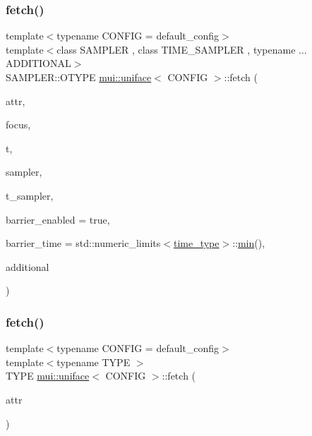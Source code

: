 \subsubsection{\texorpdfstring{fetch()}{fetch()}\hspace{0.1cm}{\footnotesize\ttfamily [1/2]}}
{\footnotesize\ttfamily template$<$typename C\+O\+N\+F\+IG  = default\+\_\+config$>$ \\
template$<$class S\+A\+M\+P\+L\+ER , class T\+I\+M\+E\+\_\+\+S\+A\+M\+P\+L\+ER , typename ... A\+D\+D\+I\+T\+I\+O\+N\+AL$>$ \\
S\+A\+M\+P\+L\+E\+R\+::\+O\+T\+Y\+PE \hyperlink{classmui_1_1uniface}{mui\+::uniface}$<$ C\+O\+N\+F\+IG $>$\+::fetch (\begin{DoxyParamCaption}\item[{const std\+::string \&}]{attr,  }\item[{const \hyperlink{classmui_1_1uniface_abc356ab801269c69e38dc07179f85ef9}{point\+\_\+type}}]{focus,  }\item[{const \hyperlink{classmui_1_1uniface_a65cbecf1936d7d61cb45f14b1138dc07}{time\+\_\+type}}]{t,  }\item[{const S\+A\+M\+P\+L\+ER \&}]{sampler,  }\item[{const T\+I\+M\+E\+\_\+\+S\+A\+M\+P\+L\+ER \&}]{t\+\_\+sampler,  }\item[{bool}]{barrier\+\_\+enabled = {\ttfamily true},  }\item[{\hyperlink{classmui_1_1uniface_a65cbecf1936d7d61cb45f14b1138dc07}{time\+\_\+type}}]{barrier\+\_\+time = {\ttfamily std\+:\+:numeric\+\_\+limits$<$\hyperlink{classmui_1_1uniface_a65cbecf1936d7d61cb45f14b1138dc07}{time\+\_\+type}$>$\+:\+:\hyperlink{namespacemui_afabb57f76b23f5a3542a0510943e69e0}{min}()},  }\item[{A\+D\+D\+I\+T\+I\+O\+N\+AL \&\&...}]{additional }\end{DoxyParamCaption})\hspace{0.3cm}{\ttfamily [inline]}}

\mbox{\label{classmui_1_1uniface_a7f1cd967f1ed10c987c882f41474a54a}} 
\subsubsection{\texorpdfstring{fetch()}{fetch()}\hspace{0.1cm}{\footnotesize\ttfamily [2/2]}}
{\footnotesize\ttfamily template$<$typename C\+O\+N\+F\+IG  = default\+\_\+config$>$ \\
template$<$typename T\+Y\+PE $>$ \\
T\+Y\+PE \hyperlink{classmui_1_1uniface}{mui\+::uniface}$<$ C\+O\+N\+F\+IG $>$\+::fetch (\begin{DoxyParamCaption}\item[{const std\+::string \&}]{attr }\end{DoxyParamCaption})\hspace{0.3cm}{\ttfamily [inline]}}



